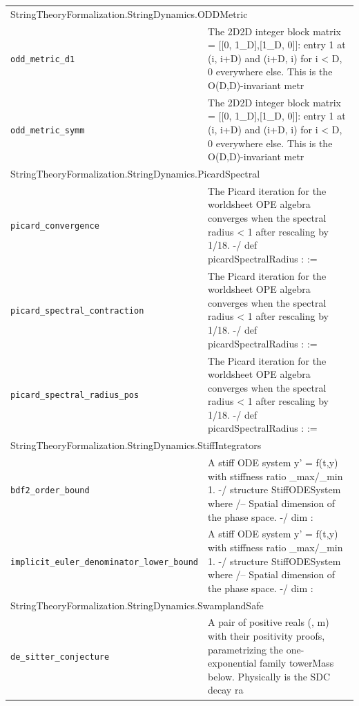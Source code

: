 \begin{longtable}{p{}p{}}
\multicolumn{2}{l}{\textsf{\small StringTheoryFormalization.StringDynamics.ODDMetric}} \\
\quad\texttt{\footnotesize odd\_metric\_d1} & {\footnotesize The 2D2D integer block matrix  = [[0, 1\_D],[1\_D, 0]]: entry 1 at (i, i+D) and (i+D, i) for i < D, 0 everywhere else. This is the O(D,D)-invariant metr} \\
\quad\texttt{\footnotesize odd\_metric\_symm} & {\footnotesize The 2D2D integer block matrix  = [[0, 1\_D],[1\_D, 0]]: entry 1 at (i, i+D) and (i+D, i) for i < D, 0 everywhere else. This is the O(D,D)-invariant metr} \\
\multicolumn{2}{l}{\textsf{\small StringTheoryFormalization.StringDynamics.PicardSpectral}} \\
\quad\texttt{\footnotesize picard\_convergence} & {\footnotesize The Picard iteration for the worldsheet OPE algebra converges when the spectral radius  < 1 after rescaling by 1/18. -/ def picardSpectralRadius :  :=} \\
\quad\texttt{\footnotesize picard\_spectral\_contraction} & {\footnotesize The Picard iteration for the worldsheet OPE algebra converges when the spectral radius  < 1 after rescaling by 1/18. -/ def picardSpectralRadius :  :=} \\
\quad\texttt{\footnotesize picard\_spectral\_radius\_pos} & {\footnotesize The Picard iteration for the worldsheet OPE algebra converges when the spectral radius  < 1 after rescaling by 1/18. -/ def picardSpectralRadius :  :=} \\
\multicolumn{2}{l}{\textsf{\small StringTheoryFormalization.StringDynamics.StiffIntegrators}} \\
\quad\texttt{\footnotesize bdf2\_order\_bound} & {\footnotesize A stiff ODE system y' = f(t,y) with stiffness ratio \_max/\_min  1. -/ structure StiffODESystem where /-- Spatial dimension of the phase space. -/ dim :} \\
\quad\texttt{\footnotesize implicit\_euler\_denominator\_lower\_bound} & {\footnotesize A stiff ODE system y' = f(t,y) with stiffness ratio \_max/\_min  1. -/ structure StiffODESystem where /-- Spatial dimension of the phase space. -/ dim :} \\
\multicolumn{2}{l}{\textsf{\small StringTheoryFormalization.StringDynamics.SwamplandSafe}} \\
\quad\texttt{\footnotesize de\_sitter\_conjecture} & {\footnotesize A pair of positive reals (, m) with their positivity proofs, parametrizing the one-exponential family towerMass below. Physically  is the SDC decay ra} \\

\end{longtable}
